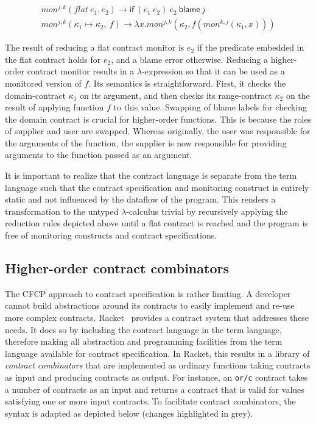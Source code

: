 \documentclass[acmsmall]{acmart}
\begin{document}
\begin{align*}
\mathit{mon}^{j, k}(\textit{flat}~e_1, e_2) \rightarrow \mathsf{if}~(e_1~e_2)~e_2~\mathsf{blame}~j \\
\mathit{mon}^{j, k}(\kappa_1 \mapsto \kappa_2, ~f) \rightarrow \lambda x . \mathit{mon}^{j,k}(\kappa_2, f (\mathit{mon}^{k, j}(\kappa_1, x)))
\end{align*}

The result of reducing a flat contract monitor is $e_2$ if the predicate embedded in the flat contract holds for $e_2$, and a blame error otherwise. 
Reducing a higher-order contract monitor results in a $\lambda$-expression so that it can be used as a monitored version of $f$. 
Its semantics is straightforward. 
First, it checks the domain-contract $\kappa_1$ on its argument, and then checks its range-contract $\kappa_2$ on the result of applying function $f$ to this value.
Swapping of blame labels for checking the domain contract is crucial for higher-order functions.
This is because the roles of supplier and user are swapped. 
Whereas originally, the user was responsible for the arguments of the function, the supplier is now responsible for providing arguments to the function passed as an argument.

It is important to realize that the contract language is separate from the term language such that the contract specification and monitoring construct is entirely static and not influenced by the dataflow of the program. 
This renders a transformation to the untyped $\lambda$-calculus trivial by recursively applying the reduction rules depicted above until a flat contract is reached and the program 
is free of monitoring constructs and contract specifications.

\subsection{Higher-order contract combinators}

The CFCP approach to contract specification is rather limiting. 
A developer cannot build abstractions around its contracts to easily implement 
and re-use more complex contracts.
Racket~\cite{} provides a contract system that addresses these needs.
It does so by including the contract language in the term language, therefore making 
all abstraction and programming facilities from the term language available for 
contract specification.
In Racket, this results in a library of \emph{contract combinators} that 
are implemented as ordinary functions taking contracts as input and producing 
contracts as output. For instance, an \texttt{or/c} contract takes a number 
of contracts as an input and returns a contract that is valid for values 
satisfying one or more input contracts.
To facilitate contract combinators, the syntax is adapted as depicted below (changes highlighted in grey). 
\end{document}

